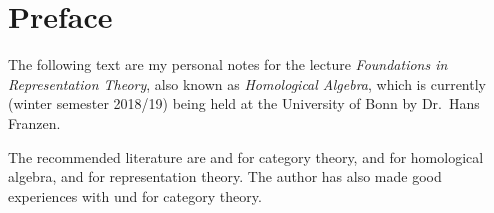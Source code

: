 \chapter{Preface}

The following text are my personal notes for the lecture \emph{Foundations in Representation Theory}, also known as \emph{Homological Algebra}, which is currently (winter semester 2018/19) being held at the University of Bonn by Dr.\ Hans Franzen.

The recommended literature are \cite{Working} and \cite{Schubert} for category theory, \cite[Chapter~1]{SheavesManifolds} and \cite{Weibel} for homological algebra, and \cite{Elements} for representation theory.
The author has also made good experiences with \cite{BasicCategory} und \cite{Brandenburg} for category theory.
